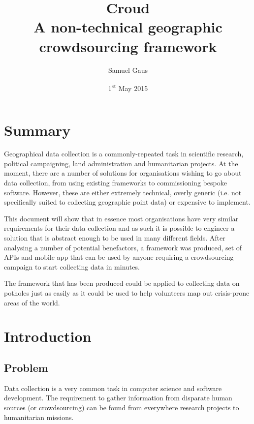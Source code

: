 \documentclass{article}
\let\oldsection\section
\renewcommand\section{\clearpage\oldsection}
\begin{document}
	\title{Croud \\ \vspace{2 mm} {\large A non-technical geographic crowdsourcing framework}}
	\author{Samuel Gaus}
	\date{1\textsuperscript{st} May 2015}
	\maketitle

	\tableofcontents

	\section{Summary}
	\label{sec:summary}
		Geographical data collection is a commonly-repeated task in scientific research, political campaigning, land administration and humanitarian projects. At the moment, there are a number of solutions for organisations wishing to go about data collection, from using existing frameworks to commissioning bespoke software. However, these are either extremely technical, overly generic (i.e. not specifically suited to collecting geographic point data) or expensive to implement.

		This document will show that in essence most organisations have very similar requirements for their data collection and as such it is possible to engineer a solution that is abstract enough to be used in many different fields. After analysing a number of potential benefactors, a framework was produced, set of APIs and mobile app that can be used by anyone requiring a crowdsourcing campaign to start collecting data in minutes.

		The framework that has been produced could be applied to collecting data on potholes just as easily as it could be used to help volunteers map out crisis-prone areas of the world.

	\section{Introduction}
	\label{sec:introduction}
		\subsection{Problem}
		Data collection is a very common task in computer science and software development. The requirement to gather information from disparate human sources (or crowdsourcing) can be found from everywhere research projects to humanitarian missions.
\end{document}
